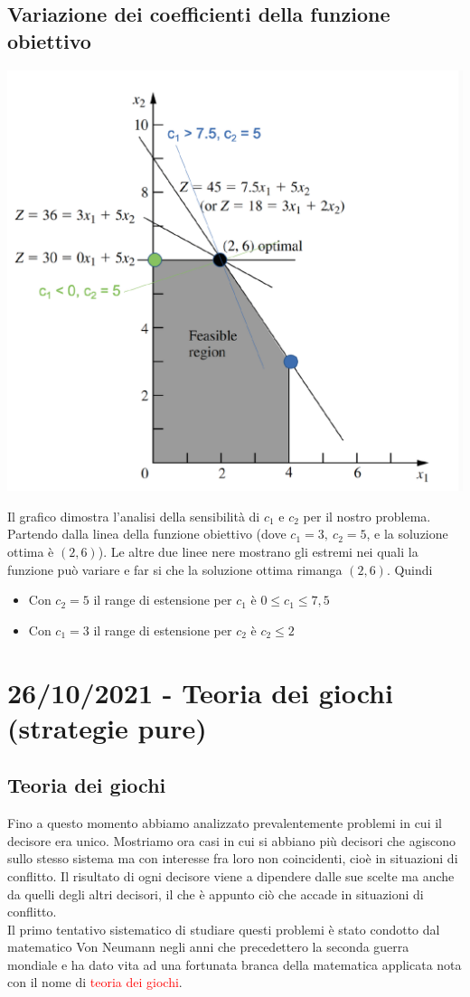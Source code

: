 \documentclass[12pt,a4paper]{article}
\begin{document}
\subsection{Variazione dei coefficienti della funzione obiettivo}
\begin{center}
\includegraphics[width=0.5\columnwidth]{img/z_variation.png}
\end{center}
Il grafico dimostra l'analisi della sensibilità di $c_1$ e $c_2$ per il nostro problema. Partendo dalla linea della funzione obiettivo (dove $c_1=3, \ c_2=5$, e la soluzione ottima è $(2,6)$). Le altre due linee nere mostrano gli estremi nei quali la funzione può variare e far si che la soluzione ottima rimanga $(2,6)$. Quindi \begin{itemize}
\item Con $c_2=5$ il range di estensione per $c_1$ è $0 \leq c_1\leq 7,5$
\item Con $c_1=3$ il range di estensione per $c_2$ è $c_2 \leq 2$
\end{itemize}

\clearpage
\section{26/10/2021 - Teoria dei giochi (strategie pure)}
\subsection{Teoria dei giochi}
Fino a questo momento abbiamo analizzato prevalentemente problemi in cui il decisore era unico. Mostriamo ora casi in cui si abbiano più decisori che agiscono sullo stesso sistema ma con interesse fra loro non coincidenti, cioè in situazioni di conflitto. Il risultato di ogni decisore viene a dipendere dalle sue scelte ma anche da quelli degli altri decisori, il che è appunto ciò che accade in situazioni di conflitto.\\
Il primo tentativo sistematico di studiare questi problemi è stato condotto dal matematico Von Neumann negli anni che precedettero la seconda guerra mondiale e ha dato vita ad una fortunata branca della matematica applicata nota con il nome di \textcolor{red}{teoria dei giochi}.
\end{document}
